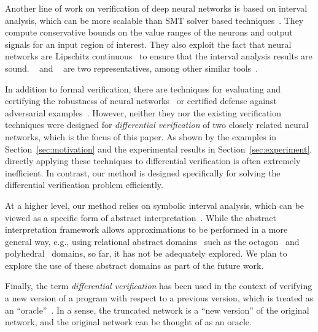 Another line of work on verification of deep neural networks is based
on interval analysis, which can be more scalable than
SMT solver based techniques~\cite{WangPWYJ18}.  They compute
conservative bounds on the value ranges of the neurons and output
signals for an input region of interest.  They also exploit the fact
that neural networks are Lipschitz continuous~\cite{RuanHK18} to
ensure that the interval analysis results are
sound.  \ReluVal{}~\cite{WangPWYJ18} and \DeepPoly{}~\cite{SinghGPV19}
are two representatives, among other similar
tools~\cite{WangPWYJ18nips,SinghGPV19iclr,MirmanGV18,GehrMDTCV18,FischerBDGZV19}.



In addition to formal verification, there are techniques for
evaluating and certifying the robustness of neural
networks~\cite{BastaniILVNC16,CarliniW17,WengZCSHDBD18,DvijothamSGMK18}
or certified defense against adversarial
examples~\cite{RaghunathanSL18,WongK18}.
%
However, neither they nor the existing verification techniques
were designed for \emph{differential verification} of two closely
related neural networks, which is the focus of this paper.
%
%
As shown by the examples in Section~\ref{sec:motivation} and the
experimental results in Section~\ref{sec:experiment}, directly
applying these techniques to differential verification is often
extremely inefficient.  In contrast, our method is designed
specifically for solving the differential verification problem efficiently.





At a higher level, our method relies on symbolic interval analysis,
which can be viewed as a specific form of abstract
interpretation~\cite{CousotC77}.  While the abstract interpretation
framework allows approximations to be performed in a more general way,
e.g., using relational abstract domains~\cite{Mine04} such as the
octagon~\cite{Mine01} and polyhedral~\cite{CousotH78} domains, so far,
it has not be adequately explored.  We plan to explore the use of
these abstract domains as part
of the future work.



Finally, the term \textit{differential verification} has been used
in the context of verifying a new version of a program with
respect to a previous version, which is treated as an ``oracle''~\cite{DAC13}.
In a sense, the truncated network is a ``new version'' of the original
network, and the original network can be thought of as an oracle.



